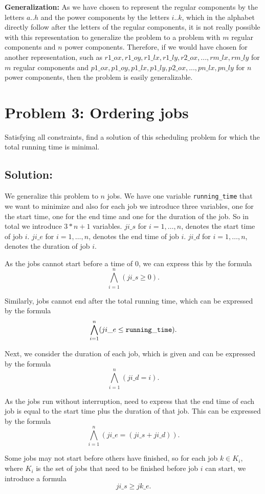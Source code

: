 \documentclass[a4paper]{article}
\begin{document}
	{\bf Generalization:} 
As we have chosen to represent the regular components by the letters $a..h$ and the power components by the letters $i..k$, which in the alphabet directly follow after the letters of the regular components, it is not really possible with this representation to generalize the problem to a problem with $m$ regular components and $n$ power components. Therefore, if we would have chosen for another representation, such as $r1\_ox, r1\_oy, r1\_lx, r1\_ly, r2\_ox,..., rm\_lx, rm\_ly$ for $m$ regular components and $p1\_ox, p1\_oy, p1\_lx, p1\_ly, p2\_ox,..., pn\_lx, pn\_ly$ for $n$ power components, then the problem is easily generalizable.
	
	\section*{Problem 3: Ordering jobs}
	Satisfying all constraints, find a solution of this scheduling problem for which the total running time is minimal.


	\subsection*{Solution:}
	We generalize this problem to $n$ jobs. We have one variable {\tt running\_time} that we want to minimize and also for each job we introduce three variables, one for the start time, one for the end time and one for the duration of the job. So in total we introduce $3*n + 1$ variables. $ji\_s$ for $i = 1,\ldots,n$, denotes the start time of job $i$. $ji\_e$ for $i = 1,\ldots,n$, denotes the end time of job $i$. $ji\_d$ for $i = 1,\ldots,n$, denotes the duration of job $i$.
	
	As the jobs cannot start before a time of 0, we can express this by the formula
\[ \bigwedge_{i=1}^n (ji\_s \geq 0).\]

	Similarly, jobs cannot end after the total running time, which can be expressed by the formula
\[ \bigwedge_{i=1}^n (ji\_e \leq {\tt running\_time}).\]

	Next, we consider the duration of each job, which is given and can be expressed by the formula
\[ \bigwedge_{i=1}^n (ji\_d = i).\]

	As the jobs run without interruption, need to express that the end time of each job is equal to the start time plus the duration of that job. This can be expressed by the formula
\[ \bigwedge_{i=1}^n (ji\_e = (ji\_s + ji\_d)).\]

	Some jobs may not start before others have finished, so for each job $k \in K_i$, where $K_i$ is the set of jobs that need to be finished before job $i$ can start, we introduce a formula
\[ ji\_s \geq jk\_e.\]
\end{document}
